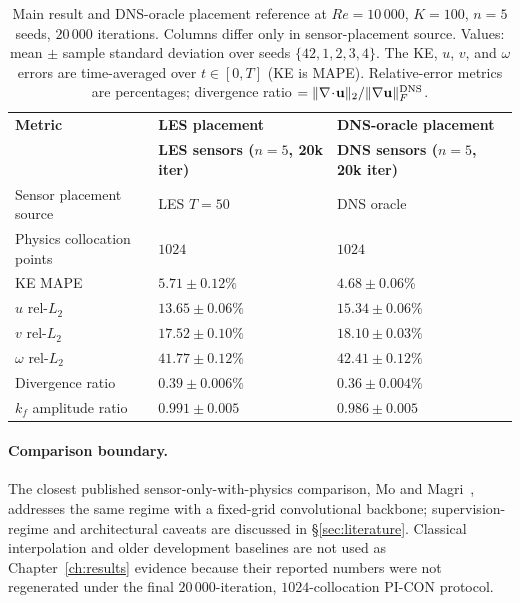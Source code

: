 \begin{table}[!htbp]
    \centering
    \caption{Main result and DNS-oracle placement reference at $Re=10\,000$, $K=100$, $n=5$ seeds, $20\,000$ iterations. Columns differ only in sensor-placement source. Values: mean $\pm$ sample standard deviation over seeds $\{42, 1, 2, 3, 4\}$. The KE, $u$, $v$, and $\omega$ errors are time-averaged over $t\in[0,T]$ (KE is MAPE). Relative-error metrics are percentages; divergence ratio $= \Vert\nabla\!\cdot\!\mathbf{u}\Vert_2 / \Vert\nabla\mathbf{u}\Vert_F^{\rm DNS}$.}
    \label{tab:main_metrics}
    \footnotesize
    \setlength{\tabcolsep}{3pt}
    \begin{tabularx}{\textwidth}{
        >{\raggedright\arraybackslash}p{3.2cm}
        >{\centering\arraybackslash}X
        >{\centering\arraybackslash}X
    }
    \toprule
    \textbf{Metric} & \textbf{LES placement} & \textbf{DNS-oracle placement} \\
    & \textbf{LES sensors ($n=5$, 20k iter)} & \textbf{DNS sensors ($n=5$, 20k iter)} \\
    \midrule
    Sensor placement source & LES $T=50$ & DNS oracle \\
    Physics collocation points & $1024$ & $1024$ \\
    KE MAPE & $5.71 \pm 0.12\%$ & $\mathbf{4.68 \pm 0.06\%}$ \\
    $u$ rel-$L_2$ & $\mathbf{13.65 \pm 0.06\%}$ & $15.34 \pm 0.06\%$ \\
    $v$ rel-$L_2$ & $\mathbf{17.52 \pm 0.10\%}$ & $18.10 \pm 0.03\%$ \\
    $\omega$ rel-$L_2$ & $\mathbf{41.77 \pm 0.12\%}$ & $42.41 \pm 0.12\%$ \\
    Divergence ratio & $0.39 \pm 0.006\%$ & $0.36 \pm 0.004\%$ \\
    $k_f$ amplitude ratio & $0.991 \pm 0.005$ & $0.986 \pm 0.005$ \\
    \bottomrule
    \end{tabularx}
\end{table}

\paragraph{Comparison boundary.}
The closest published sensor-only-with-physics comparison, Mo and Magri~\cite{Mo2025PRF}, addresses the same regime with a fixed-grid convolutional backbone; supervision-regime and architectural caveats are discussed in \S\ref{sec:literature}. Classical interpolation and older development baselines are not used as Chapter~\ref{ch:results} evidence because their reported numbers were not regenerated under the final $20\,000$-iteration, $1024$-collocation PI-CON protocol.

